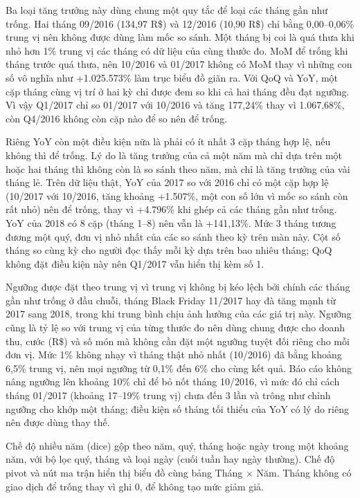 Ba loại tăng trưởng này dùng chung một quy tắc để loại các tháng gần như trống. Hai tháng 09/2016 (134,97 R\$) và 12/2016 (10,90 R\$) chỉ bằng 0,00--0,06\% trung vị nên không được dùng làm mốc so sánh. Một tháng bị coi là quá thưa khi nhỏ hơn 1\% trung vị các tháng có dữ liệu của cùng thước đo. MoM để trống khi tháng trước quá thưa, nên 10/2016 và 01/2017 không có MoM thay vì những con số vô nghĩa như +1.025.573\% làm trục biểu đồ giãn ra. Với QoQ và YoY, một cặp tháng cùng vị trí ở hai kỳ chỉ được đem so khi cả hai tháng đều đạt ngưỡng. Vì vậy Q1/2017 chỉ so 01/2017 với 10/2016 và tăng 177,24\% thay vì 1.067,68\%, còn Q4/2016 không còn cặp nào để so nên để trống.

Riêng YoY còn một điều kiện nữa là phải có ít nhất 3 cặp tháng hợp lệ, nếu không thì để trống. Lý do là tăng trưởng của cả một năm mà chỉ dựa trên một hoặc hai tháng thì không còn là so sánh theo năm, mà chỉ là tăng trưởng của vài tháng lẻ. Trên dữ liệu thật, YoY của 2017 so với 2016 chỉ có một cặp hợp lệ (10/2017 với 10/2016, tăng khoảng +1.507\%, một con số lớn vì mốc so sánh còn rất nhỏ) nên để trống, thay vì +4.796\% khi ghép cả các tháng gần như trống. YoY của 2018 có 8 cặp (tháng 1--8) nên vẫn là +141,13\%. Mức 3 tháng tương đương một quý, đơn vị nhỏ nhất của các so sánh theo kỳ trên màn này. Cột số tháng so cùng kỳ cho người đọc thấy mỗi kỳ dựa trên bao nhiêu tháng; QoQ không đặt điều kiện này nên Q1/2017 vẫn hiển thị kèm số 1.

Ngưỡng được đặt theo trung vị vì trung vị không bị kéo lệch bởi chính các tháng gần như trống ở đầu chuỗi, tháng Black Friday 11/2017 hay đà tăng mạnh từ 2017 sang 2018, trong khi trung bình chịu ảnh hưởng của các giá trị này. Ngưỡng cũng là tỷ lệ so với trung vị của từng thước đo nên dùng chung được cho doanh thu, cước (R\$) và số món mà không cần đặt một ngưỡng tuyệt đối riêng cho mỗi đơn vị. Mức 1\% không nhạy vì tháng thật nhỏ nhất (10/2016) đã bằng khoảng 6,5\% trung vị, nên mọi ngưỡng từ 0,1\% đến 6\% cho cùng kết quả. Báo cáo không nâng ngưỡng lên khoảng 10\% chỉ để bỏ nốt tháng 10/2016, vì mức đó chỉ cách tháng 01/2017 (khoảng 17--19\% trung vị) chưa đến 3 lần và trông như chỉnh ngưỡng cho khớp một tháng; điều kiện số tháng tối thiểu của YoY có lý do riêng nên được dùng thay thế.

Chế độ nhiều năm (dice) gộp theo năm, quý, tháng hoặc ngày trong một khoảng năm, với bộ lọc quý, tháng và loại ngày (cuối tuần hay ngày thường). Chế độ pivot và nút ma trận hiển thị biểu đồ cùng bảng Tháng $\times$ Năm. Tháng không có giao dịch để trống thay vì ghi 0, để không tạo mức giảm giả.

